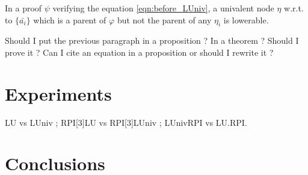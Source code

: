 \documentclass{llncs}
\newcommand{\dual}[1]{{\ensuremath{\bar{#1}}}}
\newenvironment{jogo}{\color{teal}}{}
\begin{document}
In a proof $\psi$ verifying the equation \ref{eqn:before_LUniv}, a univalent node $\eta$ w.r.t. to
$\{\dual{a_i}\}$ which is a parent of $\varphi$ but not the parent of any $\eta_i$ is lowerable.

\begin{jogo}
Should I put the previous paragraph in a proposition ? In a theorem ? Should I prove it ? Can I cite
an equation in a proposition or should I rewrite it ?
\end{jogo}

\section{Experiments}

\begin{jogo}
LU vs LUniv ; RPI[3]LU vs RPI[3]LUniv ; LUnivRPI vs LU.RPI.
\end{jogo}

\section{Conclusions}



\end{document}
